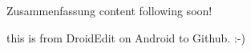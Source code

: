 \Large{Zusammenfassung} 
\newline
content following soon!

this is from DroidEdit on Android to Github. :-)
